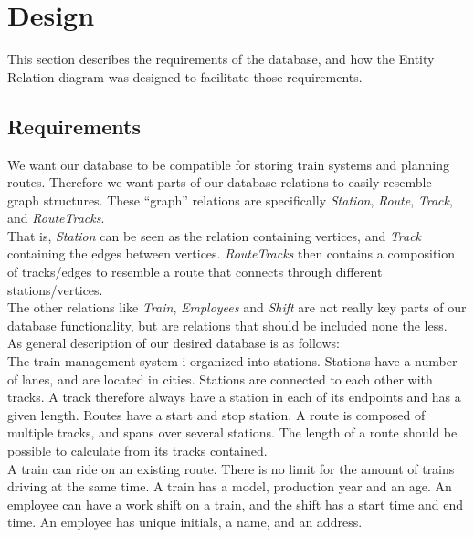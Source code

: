 \section{Design} \label{sec:design}

This section describes the requirements of the database, and how the Entity 
Relation diagram was designed to facilitate those requirements. 

\subsection{Requirements}

We want our database to be compatible for storing train systems and planning 
routes. Therefore we want parts of our database relations to easily resemble 
graph structures. These ``graph'' relations are specifically \emph{Station}, 
\emph{Route}, \emph{Track}, and \emph{RouteTracks}.\\
That is, \emph{Station} can be seen as the relation containing vertices, and \emph{Track} containing the edges between vertices. \emph{RouteTracks} then contains a composition of tracks/edges to resemble a route that connects through different stations/vertices.\\
The other relations like \emph{Train}, \emph{Employees} and \emph{Shift} are 
not really key parts of our database functionality, but are relations that 
should be included none the less.
\\[12pt]
As general description of our desired database is as follows:\\
The train management system i organized into stations. Stations have a number of lanes, and are located in cities. Stations are connected to each other with tracks. A track therefore always have a station in each of its endpoints and has a given length. Routes have a start and stop station. A route is composed of multiple tracks, and spans over several stations. The length of a route should be possible to calculate from its tracks contained.\\
A train can ride on an existing route. There is no limit for the amount of trains driving at the same time. A train has a model, production year and an age. An employee can have a work shift on a train, and the shift has a start time and end time. An employee has unique initials, a name, and an address.

